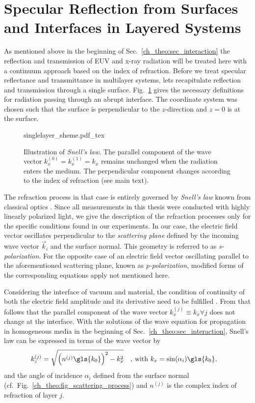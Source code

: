 \section{Specular Reflection from Surfaces and Interfaces in Layered Systems} \label{ch_theo:sec_multilayer}
As mentioned above in the beginning of Sec.~\ref{ch_theo:sec_interaction} the reflection and transmission of EUV and x-ray radiation will be treated here with a continuum approach based on the index of refraction. Before we treat specular reflectance and transmittance in multilayer systems, lets recapitulate reflection and transmission through a single surface. Fig.~\ref{ch_theo:fig_singlelayer_scheme} gives the necessary definitions for radiation passing through an abrupt interface. The coordinate system was chosen such that the surface is perpendicular to the $z$-direction and $z=0$ is at the surface.
\begin{figure}[htb]
    \def\svgwidth{0.57\textwidth}
    {singlelayer_sheme.pdf_tex}
    \caption[Illustration of \emph{Snell's law}.]{Illustration of \emph{Snell's law}. The parallel component of the wave vector $k_x^{(0)} = k_x^{(1)} = k_x$ remains unchanged when the radiation enters the medium. The perpendicular component changes according to the index of refraction (see main text).}
    \label{ch_theo:fig_singlelayer_scheme}
\end{figure}
The refraction process in that case is entirely governed by \emph{Snell's law} known from classical optics \cite{born_principles_1965}. Since all measurements in this thesis were conducted with highly linearly polarized light, we give the description of the refraction processes only for the specific conditions found in our experiments. In our case, the electric field vector oscillates perpendicular to the \emph{scattering plane} defined by the incoming wave vector $\vec{k}_i$ and the surface normal. This geometry is referred to as \emph{s-polarization}. For the opposite case of an electric field vector oscillating parallel to the aforementioned scattering plane, known as \emph{p-polarization}, modified forms of the corresponding equations apply not mentioned here.

Considering the interface of vacuum and material, the condition of continuity of both the electric field amplitude and its derivative need to be fulfilled \cite{born_principles_1965, gibaud_specular_2009}. From that follows that the parallel component of the wave vector $k_x^{(j)} \equiv k_x \forall j$ does not change at the interface. With the solutions of the wave equation for propagation in homogeneous media in the beginning of Sec.~\ref{ch_theo:sec_interaction}, Snell's law can be expressed in terms of the wave vector by
\begin{align}
k_z^{(j)} &= \sqrt{\Big(n^{(j)} \gls{k_0}\Big)^2 - k_x^2} \quad \text{, with } k_x = \sin(\alpha_i) \gls{k_0} \text{,} \label{ch_theo:eqn_snells_law}
\end{align}
and the angle of incidence $\alpha_i$ defined from the surface normal (cf.~Fig.~\ref{ch_theo:fig_scattering_process}) and $n^{(j)}$ is the complex index of refraction of layer $j$.

